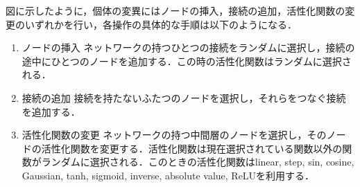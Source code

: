 図に示したように，個体の変異にはノードの挿入，接続の追加，活性化関数の変更のいずれかを行い，各操作の具体的な手順は以下のようになる．

\begin{enumerate}
    \item ノードの挿入
    ネットワークの持つひとつの接続をランダムに選択し，接続の途中にひとつのノードを追加する．この時の活性化関数はランダムに選択される．

    \item 接続の追加
    接続を持たないふたつのノードを選択し，それらをつなぐ接続を追加する．

    \item 活性化関数の変更
    ネットワークの持つ中間層のノードを選択し，そのノードの活性化関数を変更する．活性化関数は現在選択されている関数以外の関数がランダムに選択される．このときの活性化関数はlinear, step, sin, cosine, Gaussian, tanh, sigmoid, inverse, absolute value, ReLUを利用する．
\end{enumerate}